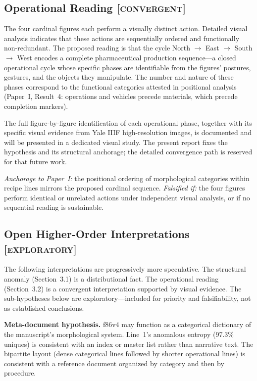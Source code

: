 \documentclass[11pt,a4paper]{article}
\newcommand{\convergent}{\textsc{[convergent]}}
\newcommand{\exploratory}{\textsc{[exploratory]}}
\begin{document}
\subsection{Operational Reading \convergent{}}

The four cardinal figures each perform a visually distinct action. Detailed visual analysis indicates that these actions are sequentially ordered and functionally non-redundant. The proposed reading is that the cycle North $\rightarrow$ East $\rightarrow$ South $\rightarrow$ West encodes a complete pharmaceutical production sequence---a closed operational cycle whose specific phases are identifiable from the figures' postures, gestures, and the objects they manipulate. The number and nature of these phases correspond to the functional categories attested in positional analysis (Paper~I, Result~4: operations and vehicles precede materials, which precede completion markers).

The full figure-by-figure identification of each operational phase, together with its specific visual evidence from Yale IIIF high-resolution images, is documented and will be presented in a dedicated visual study. The present report fixes the hypothesis and its structural anchorage; the detailed convergence path is reserved for that future work.

\textit{Anchorage to Paper~I:} the positional ordering of morphological categories within recipe lines mirrors the proposed cardinal sequence. \textit{Falsified if:} the four figures perform identical or unrelated actions under independent visual analysis, or if no sequential reading is sustainable.

\subsection{Open Higher-Order Interpretations \exploratory{}}

The following interpretations are progressively more speculative. The structural anomaly (Section~3.1) is a distributional fact. The operational reading (Section~3.2) is a convergent interpretation supported by visual evidence. The sub-hypotheses below are exploratory---included for priority and falsifiability, not as established conclusions.

\textbf{Meta-document hypothesis.} f86v4 may function as a categorical dictionary of the manuscript's morphological system. Line~1's anomalous entropy (97.3\% uniques) is consistent with an index or master list rather than narrative text. The bipartite layout (dense categorical lines followed by shorter operational lines) is consistent with a reference document organized by category and then by procedure.
\end{document}
